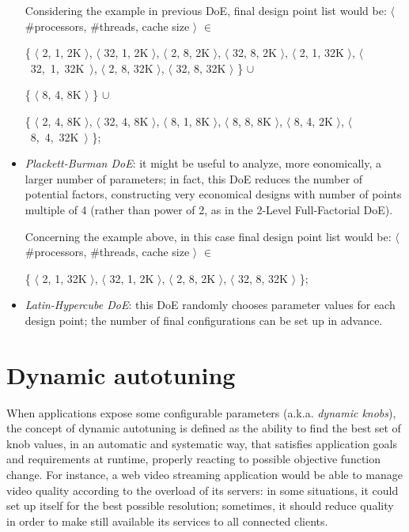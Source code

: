 \begin{itemize}
\begin{enumerate}
    \end{enumerate}
    
    Considering the example in previous DoE, final design point list would be: $\langle$ \#processors, \#threads, cache size $\rangle$ $\in$
    
    \{ $\langle$ 2, 1, 2K $\rangle$, $\langle$ 32, 1, 2K $\rangle$, $\langle$ 2, 8, 2K $\rangle$, $\langle$ 32, 8, 2K $\rangle$, $\langle$ 2, 1, 32K $\rangle$, \hbox{$\langle$ 32, 1, 32K $\rangle$}, $\langle$ 2, 8, 32K $\rangle$, $\langle$ 32, 8, 32K $\rangle$ \} $\cup$ 
    
    \{ $\langle$ 8, 4, 8K $\rangle$ \} $\cup$
    
    \{ $\langle$ 2, 4, 8K $\rangle$, $\langle$ 32, 4, 8K $\rangle$, $\langle$ 8, 1, 8K $\rangle$, $\langle$ 8, 8, 8K $\rangle$, $\langle$ 8, 4, 2K $\rangle$, \hbox{$\langle$ 8, 4, 32K $\rangle$} \};
    
    \item \textit{Plackett-Burman DoE}: it might be useful to analyze, more eonomically, a larger number of parameters; in fact, this DoE reduces the number of potential factors, constructing very economical designs with number of points multiple of 4 (rather than power of 2, as in the 2-Level Full-Factorial DoE).
    
    Concerning the example above, in this case final design point list would be: $\langle$ \#processors, \#threads, cache size $\rangle$ $\in$
    
    \{ $\langle$ 2, 1, 32K $\rangle$, $\langle$ 32, 1, 2K $\rangle$, $\langle$ 2, 8, 2K $\rangle$, $\langle$ 32, 8, 32K $\rangle$ \};
    
    \item \textit{Latin-Hypercube DoE}: this DoE randomly chooses parameter values for each design point; the number of final configurations can be set up in advance.

\end{itemize}





\section{Dynamic autotuning}

When applications expose some configurable parameters (a.k.a. \textit{dynamic knobs}), the concept of dynamic autotuning is defined as the ability to find the best set of knob values, in an automatic and systematic way, that satisfies application goals and requirements at runtime, properly reacting to possible objective function change. For instance, a web video streaming application would be able to manage video quality according to the overload of its servers: in some situations, it could set up itself for the best possible resolution; sometimes, it should reduce quality in order to make still available its services to all connected clients.

